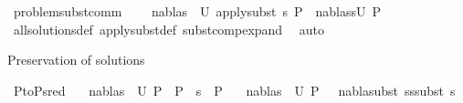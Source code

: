 \begin{isabellebody}
\endisatagproof
{\isafoldproof}%
%
\isadelimproof
\isanewline
%
\endisadelimproof
\isanewline
{}\isamarkupfalse%
\ problem{\isacharunderscore}{\kern0pt}subst{\isacharunderscore}{\kern0pt}comm{\isacharcolon}{\kern0pt}\ \isanewline
\ \ \ {\isachardoublequoteopen}{\isacharparenleft}{\kern0pt}{\isacharparenleft}{\kern0pt}nabla{\isacharcomma}{\kern0pt}s{}{\isacharparenright}{\kern0pt}\ {\isasymin}\ U\ {\isacharparenleft}{\kern0pt}apply{\isacharunderscore}{\kern0pt}subst\ s{}\ P{\isacharparenright}{\kern0pt}{\isacharparenright}{\kern0pt}\ {\isacharequal}{\kern0pt}\ {\isacharparenleft}{\kern0pt}{\isacharparenleft}{\kern0pt}nabla{\isacharcomma}{\kern0pt}{\isacharparenleft}{\kern0pt}s{}{\isasymbullet}s{}{\isacharparenright}{\kern0pt}{\isacharparenright}{\kern0pt}{\isasymin}U\ P{\isacharparenright}{\kern0pt}{\isachardoublequoteclose}\isanewline
%
\isadelimproof
\ \ %
\endisadelimproof
%
\isatagproof
{}\isamarkupfalse%
\ all{\isacharunderscore}{\kern0pt}solutions{\isacharunderscore}{\kern0pt}def\ apply{\isacharunderscore}{\kern0pt}subst{\isacharunderscore}{\kern0pt}def\ subst{\isacharunderscore}{\kern0pt}comp{\isacharunderscore}{\kern0pt}expand\ \isamarkupfalse%
\ auto%
\endisatagproof
{\isafoldproof}%
%
\isadelimproof
%
\endisadelimproof
%
\begin{isamarkuptext}%
Preservation of solutions%
\end{isamarkuptext}\isamarkuptrue%
\isamarkupfalse%
\ P{}{\isacharunderscore}{\kern0pt}to{\isacharunderscore}{\kern0pt}P{}{\isacharunderscore}{\kern0pt}sred{\isacharcolon}{\kern0pt}\isanewline
\ \ \ {\isachardoublequoteopen}{\isacharparenleft}{\kern0pt}nabla{}{\isacharcomma}{\kern0pt}s{}{\isacharparenright}{\kern0pt}\ {\isasymin}\ U\ P{}{\isachardoublequoteclose}\ \ {\isachardoublequoteopen}P{}\ {\isasymturnstile}\ s{}\ {\isasymleadsto}\ P{}{\isachardoublequoteclose}\isanewline
\ \ \ {\isachardoublequoteopen}{\isacharparenleft}{\kern0pt}nabla{}{\isacharcomma}{\kern0pt}s{}{\isacharparenright}{\kern0pt}\ {\isasymin}\ U\ P{}\ \ {\isasymand}\ {\isacharparenleft}{\kern0pt}nabla{}{\isasymTurnstile}subst\ {\isacharparenleft}{\kern0pt}s{}{\isasymbullet}s{}{\isacharparenright}{\kern0pt}{\isasymapprox}subst\ s{}{\isacharparenright}{\kern0pt}{\isachardoublequoteclose}\isanewline

\end{isabellebody}
